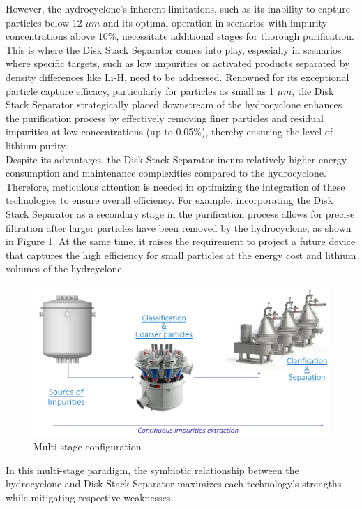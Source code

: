 \noindent However, the hydrocyclone's inherent limitations, such as its inability to capture particles below 12 $\mu m$ and its optimal operation in scenarios with impurity concentrations above 10\%, necessitate additional stages for thorough purification. This is where the Disk Stack Separator comes into play, especially in scenarios where specific targets, such as low impurities or activated products separated by density differences like Li-H, need to be addressed. Renowned for its exceptional particle capture efficacy, particularly for particles as small as 1 $\mu m$, the Disk Stack Separator strategically placed downstream of the hydrocyclone enhances the purification process by effectively removing finer particles and residual impurities at low concentrations (up to 0.05\%), thereby ensuring the level of lithium purity.\\


\noindent Despite its advantages, the Disk Stack Separator incurs relatively higher energy consumption and maintenance complexities compared to the hydrocyclone. Therefore, meticulous attention is needed in optimizing the integration of these technologies to ensure overall efficiency. For example, incorporating the Disk Stack Separator as a secondary stage in the purification process allows for precise filtration after larger particles have been removed by the hydrocyclone, as shown in Figure \ref{multi_stage}. At the same time, it raises the requirement to project a future device that captures the high efficiency for small particles at the energy cost and lithium volumes of the hydrcyclone.

\begin{figure}[H]
	\centering
	\includegraphics[width=0.9\linewidth]{multi_stage.png}
	\captionsetup{font=bf, size=small}
	\caption{Multi stage configuration}
	\label{multi_stage}
\end{figure}

\noindent In this multi-stage paradigm, the symbiotic relationship between the hydrocyclone and Disk Stack Separator maximizes each technology's strengths while mitigating respective weaknesses. \\


